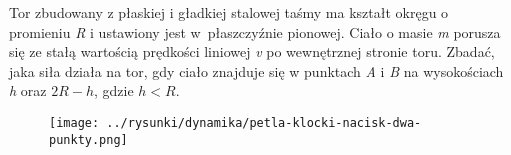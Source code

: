 Tor zbudowany z płaskiej i gładkiej stalowej taśmy ma kształt okręgu o promieniu \emph{R} i ustawiony jest w~płaszczyźnie pionowej. Ciało o masie \emph{m} porusza się ze stałą wartością prędkości liniowej \emph{v} po wewnętrznej stronie toru. Zbadać, jaka siła działa na tor, gdy ciało znajduje się w punktach \emph{A} i \emph{B} na wysokościach \emph{h} oraz $2R - h$, gdzie $h < R$.

\begin{figure}[H]
	\centering
	\texttt{[image: ../rysunki/dynamika/petla-klocki-nacisk-dwa-punkty.png]}
\end{figure}

